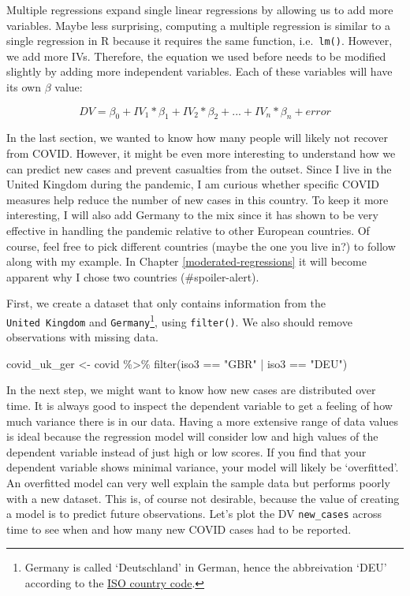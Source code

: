 \documentclass[
]{book}
\newenvironment{Shaded}{\begin{snugshade}}{\end{snugshade}}
\newcommand{\FunctionTok}[1]{\textcolor[rgb]{0.00,0.00,0.00}{#1}}
\newcommand{\NormalTok}[1]{#1}
\newcommand{\OtherTok}[1]{\textcolor[rgb]{0.56,0.35,0.01}{#1}}
\newcommand{\SpecialCharTok}[1]{\textcolor[rgb]{0.00,0.00,0.00}{#1}}
\newcommand{\StringTok}[1]{\textcolor[rgb]{0.31,0.60,0.02}{#1}}
\begin{document}
Multiple regressions expand single linear regressions by allowing us to add more variables. Maybe less surprising, computing a multiple regression is similar to a single regression in R because it requires the same function, i.e.~\texttt{lm()}. However, we add more IVs. Therefore, the equation we used before needs to be modified slightly by adding more independent variables. Each of these variables will have its own \(\beta\) value:

\[
DV = \beta_{0} + IV_{1} * \beta_{1} + IV_{2} * \beta_{2} + ... + IV_{n} * \beta_{n} + error
\]

In the last section, we wanted to know how many people will likely not recover from COVID. However, it might be even more interesting to understand how we can predict new cases and prevent casualties from the outset. Since I live in the United Kingdom during the pandemic, I am curious whether specific COVID measures help reduce the number of new cases in this country. To keep it more interesting, I will also add Germany to the mix since it has shown to be very effective in handling the pandemic relative to other European countries. Of course, feel free to pick different countries (maybe the one you live in?) to follow along with my example. In Chapter \ref{moderated-regressions} it will become apparent why I chose two countries (\#spoiler-alert).

First, we create a dataset that only contains information from the \texttt{United\ Kingdom} and \texttt{Germany}\footnote{Germany is called `Deutschland' in German, hence the abbreivation `DEU' according to the \href{https://www.iso.org/obp/ui/\#iso:code:3166:DE}{ISO country code}.}, using \texttt{filter()}. We also should remove observations with missing data.

\begin{Shaded}
\begin{Highlighting}[]
\NormalTok{covid\_uk\_ger }\OtherTok{\textless{}{-}}\NormalTok{ covid }\SpecialCharTok{\%\textgreater{}\%}
  \FunctionTok{filter}\NormalTok{(iso3 }\SpecialCharTok{==} \StringTok{"GBR"} \SpecialCharTok{|}\NormalTok{ iso3 }\SpecialCharTok{==} \StringTok{"DEU"}\NormalTok{)}
\end{Highlighting}
\end{Shaded}

In the next step, we might want to know how new cases are distributed over time. It is always good to inspect the dependent variable to get a feeling of how much variance there is in our data. Having a more extensive range of data values is ideal because the regression model will consider low and high values of the dependent variable instead of just high or low scores. If you find that your dependent variable shows minimal variance, your model will likely be `overfitted'. An overfitted model can very well explain the sample data but performs poorly with a new dataset. This is, of course not desirable, because the value of creating a model is to predict future observations. Let's plot the DV \texttt{new\_cases} across time to see when and how many new COVID cases had to be reported.
\end{document}
